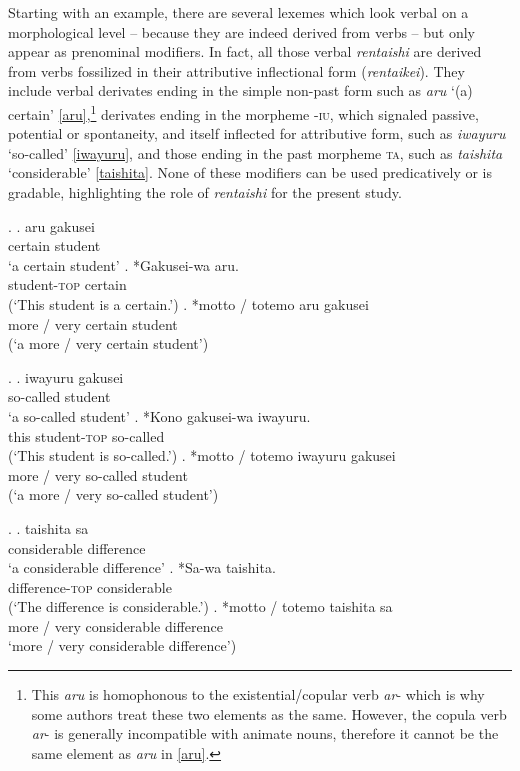 \documentclass [output=book,colorlinks,citecolor=brown]{langscibook}
\begin{document}
Starting with an example, there are several lexemes which look verbal on a morphological level -- because they are indeed derived from verbs -- but only appear as prenominal modifiers. In fact, all those verbal \textit{rentaishi} are derived from verbs fossilized in their attributive inflectional form (\textit{rentaikei}). They include verbal derivates ending in the simple non-past form such as \textit{aru} `(a) certain’ \ref{aru},\footnote{This \textit{aru} is homophonous to the existential/copular verb \textit{ar}- which is why some authors \citep{lehmann:2015:japanisch} treat these two elements as the same. However, the copula verb \textit{ar}- is generally incompatible with animate nouns, therefore it cannot be the same element as \textit{aru} in \ref{aru}.} derivates ending in the morpheme -\textsc{iu}, which signaled passive, potential or spontaneity, and itself inflected for attributive form, such as \textit{iwayuru} `so-called’ \ref{iwayuru}, and those ending in the past morpheme \textsc{ta}, such as \textit{taishita} `considerable’ \ref{taishita}. None of these modifiers can be used predicatively or is gradable, highlighting the role of \textit{rentaishi} for the present study. %

\ex. \label{aru} \ag. aru gakusei\\
certain student\\
`a certain student'
\bg. *Gakusei-wa aru.\\
student-\textsc{top} certain\\
(`This student is a certain.’)
\cg. *motto / totemo aru gakusei\\
more / very certain student\\
(`a more / very certain student’)


\ex. \label{iwayuru} \ag. iwayuru gakusei\\
so-called student\\
`a so-called student'
\bg. *Kono gakusei-wa iwayuru.\\
this student-\textsc{top} so-called\\
(`This student is so-called.’)
\cg. *motto / totemo iwayuru gakusei\\
more / very so-called student\\
(`a more / very so-called student’)

\ex. \label{taishita} \ag. taishita sa\\
considerable difference\\
`a considerable difference’
\bg. *Sa-wa taishita.\\
difference-\textsc{top} considerable\\
(`The difference is considerable.’)
\cg. *motto / totemo taishita sa\\
more / very considerable difference\\
`more / very considerable difference’)
\end{document}
